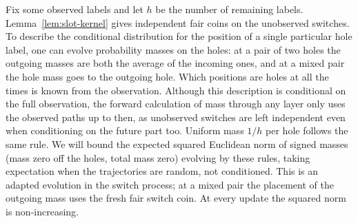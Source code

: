 Fix some observed labels and let $h$ be the number of remaining labels. Lemma~\ref{lem:slot-kernel} gives independent fair coins on the unobserved switches. To describe the conditional distribution for the position of a single particular hole label, one can evolve probability masses on the holes: at a pair of two holes the outgoing masses are both the average of the incoming ones, and at a mixed pair the hole mass goes to the outgoing hole. Which positions are holes at all the times is known from the observation. Although this description is conditional on the full observation, the forward calculation of mass through any layer only uses the observed paths up to then, as unobserved switches are left independent even when conditioning on the future part too. Uniform mass \(1/h\) per hole follows the same rule. We will bound the expected squared Euclidean norm of signed masses (mass zero off the holes, total mass zero) evolving by these rules, taking expectation when the trajectories are random, not conditioned. This is an adapted evolution in the switch process; at a mixed pair the placement of the outgoing mass uses the fresh fair switch coin. At every update the squared norm is non-increasing.

